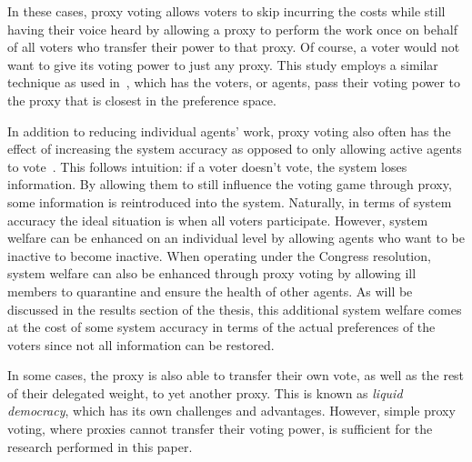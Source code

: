 In these cases, proxy voting allows voters to skip incurring the costs while
still having their voice heard by allowing a proxy to perform the work once on
behalf of all voters who transfer their power to that proxy.
Of course, a voter would not want to give its voting power to just any proxy.
This study employs a similar technique as used in~\cite{Cohensius2017}, which has the
voters, or agents, pass their voting power to the proxy that is closest in the
preference space.

In addition to reducing individual agents' work, proxy voting also often has
the effect of increasing the system accuracy as opposed to only allowing active
agents to vote~\cite{Cohensius2017}.
This follows intuition: if a voter doesn't vote, the system loses information.
By allowing them to still influence the voting game through proxy, some information
is reintroduced into the system.
Naturally, in terms of system accuracy the ideal situation is when all voters
participate.
However, system welfare can be enhanced on an individual level by allowing agents
who want to be inactive to become inactive.
When operating under the Congress resolution, system welfare can also be enhanced
through proxy voting by allowing ill members to quarantine and ensure the health
of other agents.
As will be discussed in the results section of the thesis,
this additional system welfare comes at
the cost of some system accuracy in terms of the actual preferences of the voters
since not all information can be restored.

In some cases, the proxy is also able to transfer their own vote, as well as the rest of
their delegated weight, to yet another proxy.
This is known as \textit{liquid democracy}, which has its own challenges and
advantages.
However, simple proxy voting, where proxies cannot transfer their voting power,
is sufficient for the research performed in this paper.


